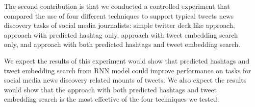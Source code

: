 The second contribution is that we conducted a controlled experiment that compared the use of four different techniques to support typical tweets news discovery tasks of social media journalists: simple twitter deck like approach,  approach with predicted hashtag only, approach with tweet embedding search only,  and approach with both predicted hashtags and tweet embedding search.

We expect the results of this experiment would show that predicted hashtags and tweet embedding search from RNN model could improve performance on tasks for social media news discovery related mounts of tweets. We also expect the results would show that the approach with both predicted hashtags and tweet embedding search is the most effective of the four techniques we tested.












